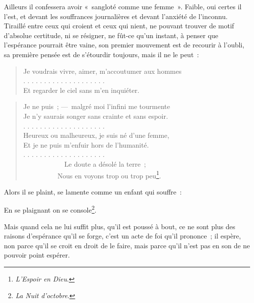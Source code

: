 \documentclass[french,twoside]{book} %
\newenvironment{quoteblock}%
  {\begin{quoting}}
  {\end{quoting}}
\newenvironment{quotebar}{%
    \def\FrameCommand{{\color{rubric!10!}\vrule width 0.5em} \hspace{0.9em}}%
    \def\OuterFrameSep{\itemsep} %
    \MakeFramed {\advance\hsize-\width \FrameRestore}
  }%
  {%
    \endMakeFramed
  }
\renewenvironment{quoteblock}%
  {%
    \savenotes
    \setstretch{0.9}
    \normalfont
    \begin{quotebar}
  }
  {%
    \end{quotebar}
    \spewnotes
  }
\begin{document}
\noindent Ailleurs il confessera avoir « sangloté comme une femme ». Faible, oui certes il l’est, et devant les souffrances journalières et devant l’anxiété de l’inconnu. Tiraillé entre ceux qui croient et ceux qui nient, ne pouvant trouver de motif d’absolue certitude, ni se résigner, ne fût-ce qu’un instant, à penser que l’espérance pourrait être vaine, son premier mouvement est de recourir à l’oubli, sa première pensée est de s’étourdir toujours, mais il ne le peut :\par


\begin{verse}
Je voudrais vivre, aimer, m’accoutumer aux hommes\\
. . . . . . . . . . . . . . . . . . . .\\
Et regarder le ciel sans m’en inquiéter.\\
\end{verse}



\begin{verse}
Je ne puis ; — malgré moi l’infini me tourmente\\
Je n’y saurais songer sans crainte et sans espoir.\\
. . . . . . . . . . . . . . . . . . . .\\
Heureux ou malheureux, je suis né d’une femme,\\
Et je ne puis m’enfuir hors de l’humanité.\\
. . . . . . . . . . . . . . . . . . . .\\
            Le doute a désolé la terre ;\\
          Nous en voyons trop ou trop peu\footnote{\emph{L’Espoir en Dieu}.}.\\
\end{verse}

\noindent Alors il se plaint, se lamente comme un enfant qui souffre :\par

\begin{quoteblock}
 \noindent En se plaignant on se console\footnote{\emph{La Nuit d’octobre}.}.
 \end{quoteblock}

\noindent Mais quand cela ne lui suffit plus, qu’il est poussé à bout, ce ne sont plus des raisons d’espérance qu’il se forge, c’est un acte de foi qu’il prononce ; il espère, non parce qu’il se croit en droit de le faire, mais parce qu’il n’est pas en son de ne pouvoir point espérer.\par
\end{document}
